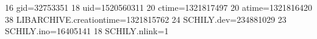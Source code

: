 16 gid=32753351
18 uid=1520560311
20 ctime=1321817497
20 atime=1321816420
38 LIBARCHIVE.creationtime=1321815762
24 SCHILY.dev=234881029
23 SCHILY.ino=16405141
18 SCHILY.nlink=1
